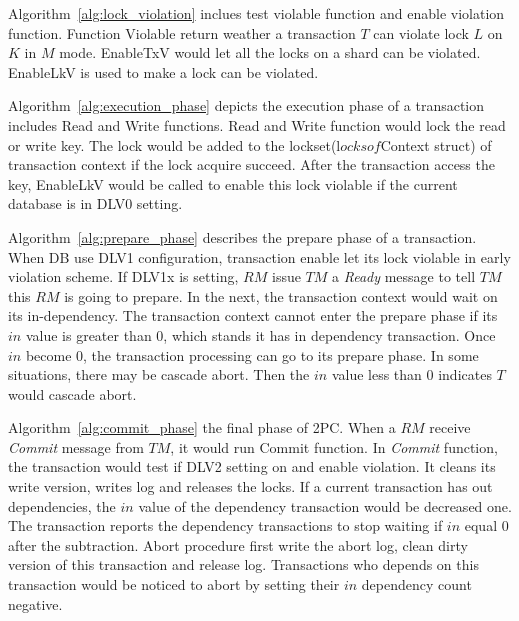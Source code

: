 \documentclass[conference]{IEEEtran}
\begin{document}
Algorithm~\ref{alg:lock_violation} inclues test violable function and enable violation function.
Function Violable return weather a transaction ${T}$ can violate lock ${L}$ on ${K}$ in ${M}$ mode.
EnableTxV would let all the locks on a shard can be violated.
EnableLkV is used to make a lock can be violated.

Algorithm~\ref{alg:execution_phase} depicts the execution phase of a transaction includes Read and Write functions.
Read and Write function would lock the read or write key.
The lock would be added to the lockset(l${ocks} of ${Context} struct) of transaction context
if the lock acquire succeed.
After the transaction access the key,
EnableLkV would be called to enable this lock violable if the current database is in DLV0 setting. 

Algorithm~\ref{alg:prepare_phase} describes the prepare phase of a transaction.
When DB use DLV1 configuration, 
transaction enable let its lock violable in early violation scheme.
If DLV1x is setting, ${RM}$ issue ${TM}$ a \emph{Ready} message to tell ${TM}$ this ${RM}$ is going to prepare.
In the next, the transaction context would wait on its in-dependency.
The transaction context cannot enter the prepare phase if its ${in}$ value is greater than 0, which stands it has in dependency transaction.
Once ${in}$ become 0, the transaction processing can go to its prepare phase.
In some situations, there may be cascade abort.
Then the ${in}$ value less than 0 indicates ${T}$ would cascade abort. 


Algorithm~\ref{alg:commit_phase} the final phase of 2PC.
When a ${RM}$ receive \emph{Commit} message from ${TM}$, it would run Commit function.
In \emph{Commit} function, the transaction would test if DLV2 setting on and enable violation.
It cleans its write version, writes log and releases the locks.
If a current transaction has out dependencies, the ${in}$ value of the dependency transaction would be decreased one.
The transaction reports the dependency transactions to stop waiting if $in$ equal 0 after the subtraction.  
Abort procedure first write the abort log, clean dirty version of this transaction and release log.
Transactions who depends on this transaction would be noticed to abort by setting their ${in}$ dependency count negative.
\end{document}
